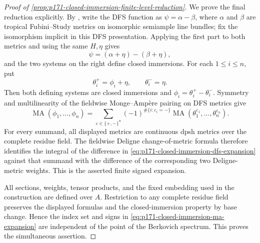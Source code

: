 \begin{proof}[Proof of
\cref{prop:p171-closed-immersion-finite-level-reduction}]
We prove the final reduction explicitly.  By
\cite[Definition~2.15]{PS23Hybrid}, write the DFS function as
\(\psi=\alpha-\beta\), where \(\alpha\) and \(\beta\) are tropical
Fubini--Study metrics on isomorphic semiample line bundles; fix the
isomorphism implicit in this DFS presentation.  Applying the first part to
both metrics and using the same \(H,\eta\) gives
\begin{equation}
\label{eq:p171-closed-immersion-dfs-expansion}
                    \psi=(\alpha+\eta)-(\beta+\eta),
\end{equation}
and the two systems on the right define closed immersions.  For each
\(1\leq i\leq n\), put
\[
                  \theta_i^+=\phi_i+\eta,
                  \qquad \theta_i^-=\eta.
\]
Then both defining systems are closed immersions and
\(\phi_i=\theta_i^+-\theta_i^-\).  Symmetry and multilinearity of the
fieldwise Monge--Amp\`ere pairing on DFS metrics
\cite[Proposition~4.2]{PS23Hybrid} give
\begin{equation}
\label{eq:p171-closed-immersion-ma-expansion}
 \operatorname{MA}(\phi_1,\ldots,\phi_n)
 =\sum_{\varepsilon\in\{+,-\}^n}
   (-1)^{\#\{i:\varepsilon_i=-\}}
   \operatorname{MA}(\theta_1^{\varepsilon_1},\ldots,
                     \theta_n^{\varepsilon_n}).
\end{equation}
For every summand, all displayed metrics are continuous dpsh metrics over
the complete residue field.  The fieldwise Deligne change-of-metric formula
\cite[Theorem~8.16 and formula~(8.9)]{BE21} therefore identifies the integral
of the difference in
\eqref{eq:p171-closed-immersion-dfs-expansion} against that summand with
the difference of the corresponding two Deligne-metric weights.  This is
the asserted finite signed expansion.

All sections, weights, tensor products, and the fixed embedding used in
the construction are defined over \(A\).  Restriction to any complete
residue field preserves the displayed formulas and the closed-immersion
property by base change.  Hence the index set and signs in
\eqref{eq:p171-closed-immersion-ma-expansion} are independent of the point
of the Berkovich spectrum.  This proves the simultaneous assertion.
\end{proof}
